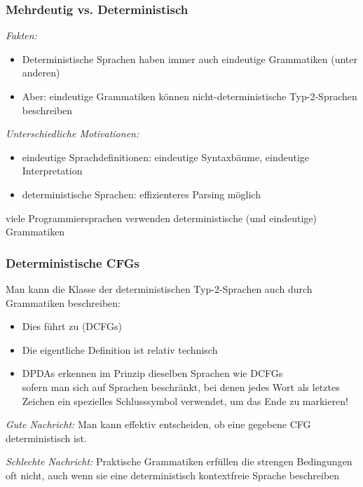 \documentclass[onlymath]{beamer}
\begin{document}
\begin{frame}\frametitle{Mehrdeutig vs. Deterministisch}

\emph{Fakten:}
\begin{itemize}
\item Deterministische Sprachen haben immer auch eindeutige Grammatiken (unter anderen)
\item Aber: eindeutige Grammatiken können nicht-deterministische Typ-2-Sprachen beschreiben
\end{itemize}
\bigskip\pause

\emph{Unterschiedliche Motivationen:}
\begin{itemize}
\item eindeutige Sprachdefinitionen: eindeutige Syntaxbäume, eindeutige Interpretation
\item deterministische Sprachen: effizienteres Parsing möglich
\end{itemize}
\alert{viele Programmiersprachen verwenden deterministische (und eindeutige) Grammatiken}

\end{frame}

\begin{frame}\frametitle{Deterministische CFGs}

Man kann die Klasse der deterministischen Typ-2-Sprachen auch durch Grammatiken
beschreiben:
\begin{itemize}
\item Dies führt zu  (DCFGs)
\item Die eigentliche Definition ist relativ technisch
\item DPDAs erkennen \alert{im Prinzip} dieselben Sprachen wie DCFGs\\
{\tiny sofern man sich auf Sprachen beschränkt, bei denen
jedes Wort als letztes Zeichen ein spezielles Schlusssymbol verwendet, um das Ende zu markieren!}
\end{itemize}\pause

\emph{Gute Nachricht:} Man kann effektiv entscheiden, ob eine gegebene CFG deterministisch ist.\pause
\medskip

\emph{Schlechte Nachricht:} Praktische Grammatiken erfüllen die strengen Bedingungen oft nicht, auch wenn sie eine
deterministisch kontextfreie Sprache beschreiben

\end{frame}
\end{document}
